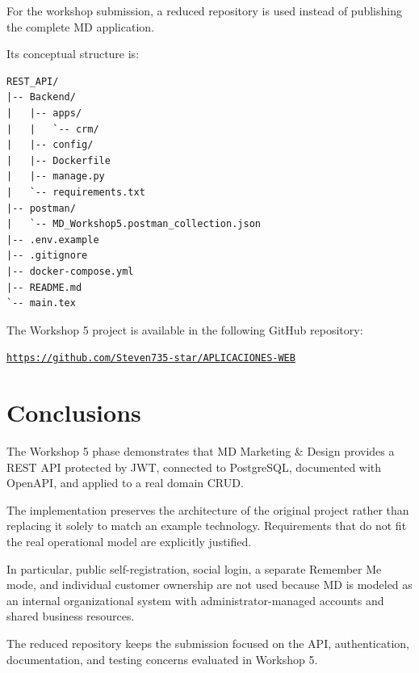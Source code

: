 \documentclass[11pt,a4paper]{article}
\begin{document}
For the workshop submission, a reduced repository is used instead of publishing the complete MD application.

Its conceptual structure is:

\begin{lstlisting}
REST_API/
|-- Backend/
|   |-- apps/
|   |   `-- crm/
|   |-- config/
|   |-- Dockerfile
|   |-- manage.py
|   `-- requirements.txt
|-- postman/
|   `-- MD_Workshop5.postman_collection.json
|-- .env.example
|-- .gitignore
|-- docker-compose.yml
|-- README.md
`-- main.tex
\end{lstlisting}

The Workshop 5 project is available in the following GitHub repository:

\begin{center}
\href{https://github.com/Steven735-star/APLICACIONES-WEB}{\texttt{https://github.com/Steven735-star/APLICACIONES-WEB}}
\end{center}

\section{Conclusions}

The Workshop 5 phase demonstrates that MD Marketing \& Design provides a REST API protected by JWT, connected to PostgreSQL, documented with OpenAPI, and applied to a real domain CRUD.

The implementation preserves the architecture of the original project rather than replacing it solely to match an example technology. Requirements that do not fit the real operational model are explicitly justified.

In particular, public self-registration, social login, a separate Remember Me mode, and individual customer ownership are not used because MD is modeled as an internal organizational system with administrator-managed accounts and shared business resources.

The reduced repository keeps the submission focused on the API, authentication, documentation, and testing concerns evaluated in Workshop 5.
\end{document}
